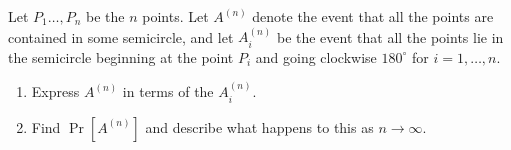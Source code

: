 \documentclass[11pt,letterpaper]{article}
\begin{document}
\begin{enumerate}
	Let $P_1 \ldots, P_n$ be the $n$ points. Let $A^{(n)}$ denote the event that all the points are contained in some semicircle, and let $A^{(n)}_i$ be the event that all the points lie in the semicircle beginning at the point $P_i$ and going clockwise $180^\circ$ for $i = 1, \ldots, n$.
	\begin{enumerate}
		\item Express $A^{(n)}$ in terms of the $A^{(n)}_i$.
		\item Find $\Pr[A^{(n)}]$ and describe what happens to this as $n\to \infty$.
	\end{enumerate}
	\vfill


\end{enumerate}
\end{document}
